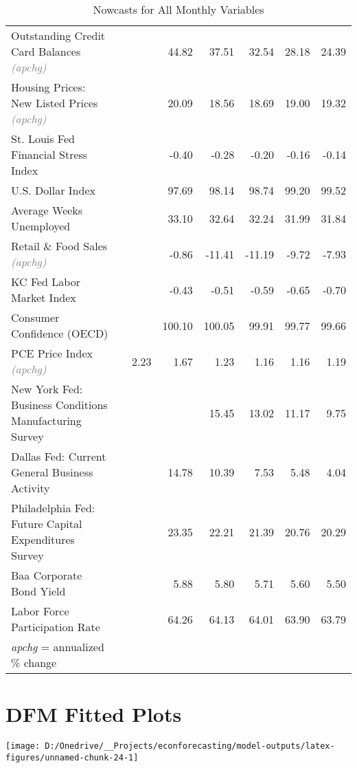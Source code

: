 \documentclass[11pt, letterpaper]{article}\usepackage[]{graphicx}\usepackage[]{color}
\begin{document}
\begin{table}[H]
\begin{tabular}{lrrrrrrr}
  Outstanding Credit Card Balances \textit{\footnotesize\textcolor{gray}{(apchg)}} &  &  & 44.82 & 37.51 & 32.54 & 28.18 & 24.39 \\ 
  Housing Prices: New Listed Prices \textit{\footnotesize\textcolor{gray}{(apchg)}} &  &  & 20.09 & 18.56 & 18.69 & 19.00 & 19.32 \\ 
  St. Louis Fed Financial Stress Index &  &  & -0.40 & -0.28 & -0.20 & -0.16 & -0.14 \\ 
  U.S. Dollar Index &  &  & 97.69 & 98.14 & 98.74 & 99.20 & 99.52 \\ 
  Average Weeks Unemployed &  &  & 33.10 & 32.64 & 32.24 & 31.99 & 31.84 \\ 
  Retail \& Food Sales \textit{\footnotesize\textcolor{gray}{(apchg)}} &  &  & -0.86 & -11.41 & -11.19 & -9.72 & -7.93 \\ 
  KC Fed Labor Market Index &  &  & -0.43 & -0.51 & -0.59 & -0.65 & -0.70 \\ 
  Consumer Confidence (OECD) &  &  & 100.10 & 100.05 & 99.91 & 99.77 & 99.66 \\ 
  PCE Price Index \textit{\footnotesize\textcolor{gray}{(apchg)}} &  & 2.23 & 1.67 & 1.23 & 1.16 & 1.16 & 1.19 \\ 
  New York Fed: Business Conditions Manufacturing Survey &  &  &  & 15.45 & 13.02 & 11.17 & 9.75 \\ 
  Dallas Fed: Current General Business Activity &  &  & 14.78 & 10.39 & 7.53 & 5.48 & 4.04 \\ 
  Philadelphia Fed: Future Capital Expenditures Survey &  &  & 23.35 & 22.21 & 21.39 & 20.76 & 20.29 \\ 
  Baa Corporate Bond Yield &  &  & 5.88 & 5.80 & 5.71 & 5.60 & 5.50 \\ 
  Labor Force Participation Rate &  &  & 64.26 & 64.13 & 64.01 & 63.90 & 63.79 \\ 
   \hline 
 \textit{apchg} = annualized \% change 
\end{tabular}
\endgroup
\caption{Nowcasts for All Monthly Variables} 
\end{table}



\appendix
\appendixpage
\addappheadtotoc

\section{DFM Fitted Plots}


{\centering \texttt{[image: D:/Onedrive/\_\_Projects/econforecasting/model-outputs/latex-figures/unnamed-chunk-24-1]} 

}
\end{document}
